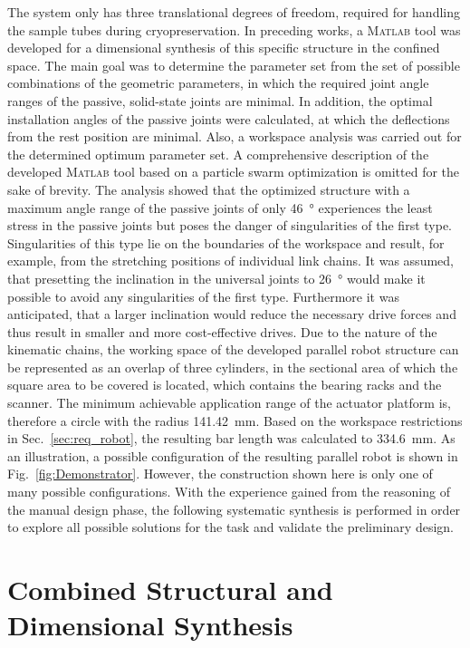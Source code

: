 \documentclass{svproc}
\begin{document}
The system only has three translational degrees of freedom, required for handling the sample tubes during cryopreservation. 
In preceding works, a \textsc{Matlab} tool was developed for a dimensional synthesis of this specific structure in the confined space. 
The main goal was to determine the parameter set from the set of possible combinations of the geometric parameters, in which the required joint angle ranges of the passive, solid-state joints are minimal. 
In addition, the optimal installation angles of the passive joints were calculated, at which the deflections from the rest position are minimal. Also, a workspace analysis was carried out for the determined optimum parameter set.
A comprehensive description of the developed \textsc{Matlab} tool based on a particle swarm optimization is omitted for the sake of brevity.
The analysis showed that the optimized structure with a maximum angle range of the passive joints of only \SI{46}{\degree} experiences the least stress in the passive joints but poses the danger of singularities of the first type. 
Singularities of this type lie on the boundaries of the workspace and result, for example, from the stretching positions of individual link chains. 
It was assumed, that presetting the inclination in the universal joints to \SI{26}{\degree} would make it possible to avoid any singularities of the first type. Furthermore it was anticipated, that a larger inclination would reduce the necessary drive forces and thus result in smaller and more cost-effective drives.
Due to the nature of the kinematic chains, the working space of the developed parallel robot structure can be represented as an overlap of three cylinders, in the sectional area of which the square area to be covered is located, which contains the bearing racks and the scanner.
The minimum achievable application range of the actuator platform is, therefore a circle with the radius \SI{141.42}{\milli\metre}. 
Based on the workspace restrictions in Sec.~\ref{sec:req_robot}, the resulting bar length was calculated to \SI{334.6}{\milli\metre}. 
As an illustration, a possible configuration of the resulting parallel robot is shown in Fig.~\ref{fig:Demonstrator}. 
However, the construction shown here is only one of many possible configurations. 
With the experience gained from the reasoning of the manual design phase, the following systematic synthesis is performed in order to explore all possible solutions for the task and validate the preliminary design. 


\section{Combined Structural and Dimensional Synthesis}
\label{sec:combined_synthesis}
\end{document}
